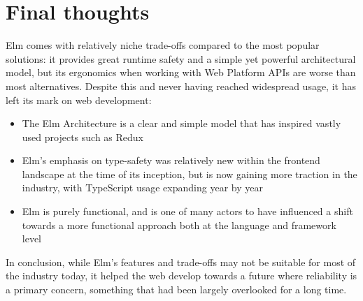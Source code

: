 \section{Final thoughts}
Elm comes with relatively niche trade-offs compared to the most popular solutions: it provides great runtime safety and a simple yet powerful architectural model, but its ergonomics when working with Web Platform APIs are worse than most alternatives. Despite this and never having reached widespread usage, it has left its mark on web development:
\begin{itemize}
    \item The Elm Architecture is a clear and simple model that has inspired vastly used projects such as Redux \cite{noauthor_prior_2024}
    \item Elm's emphasis on type-safety was relatively new within the frontend landscape at the time of its inception, but is now gaining more traction in the industry, with TypeScript usage expanding year by year \cite{staff_octoverse_2024}
    \item Elm is purely functional, and is one of many actors to have influenced a shift towards a more functional approach both at the language and framework level
\end{itemize}
In conclusion, while Elm's features and trade-offs may not be suitable for most of the industry today, it helped the web develop towards a future where reliability is a primary concern, something that had been largely overlooked for a long time.
